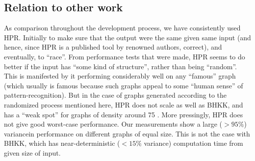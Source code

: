 \documentclass[a4paper]{article}
\begin{document}
\subsection{Relation to other work}
As comparison throughout the development process, we have consistently used HPR. Initially to make sure that the output were the same given same input (and hence, since HPR is a published tool by renowned authors, correct), and eventually, to ``race''. From performance tests that were made, HPR seems to do better if the input has ``some kind of structure'', rather than being ``random''. This is manifested by it performing considerably well on any ``famous'' graph (which usually is famous because such graphs appeal to some ``human sense'' of pattern-recognition). But in the case of graphs generated according to the randomized process mentioned here, HPR does not scale as well as BHKK, and has a ``weak spot'' for graphs of density around 75 \cite{haggard}. More pressingly, HPR does not give good worst-case performance. Our measurements show a large ($> 95\%$) variance\footnotemark in performance on different graphs of equal size. This is not the case with BHKK, which has near-deterministic ($< 15\%$ variance) computation time from given size of input.

\end{document}
